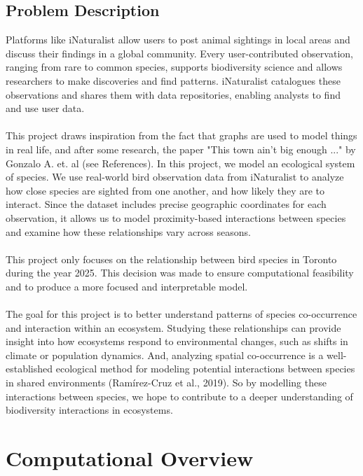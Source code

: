 \documentclass{article}
\begin{document}
\subsection*{Problem Description}
Platforms like iNaturalist allow users to post animal sightings in local areas and discuss their findings in a global community. Every user-contributed observation, ranging from rare to common species, supports biodiversity science and allows researchers to make discoveries and find patterns. iNaturalist catalogues these observations and shares them with data repositories, enabling analysts to find and use user data.\\ \\
This project draws inspiration from the fact that graphs are used to model things in real life, and after some research, the paper "This town ain't big enough ..." by Gonzalo A. et. al (see References). In this project, we model an ecological system of species. We use real-world bird observation data from iNaturalist to analyze how close species are sighted from one another, and how likely they are to interact. Since the dataset includes precise geographic coordinates for each observation, it allows us to model proximity-based interactions between species and examine how these relationships vary across seasons. \\ \\
This project only focuses on the relationship between bird species in Toronto during the year 2025. This decision was made to ensure computational feasibility and to produce a more focused and interpretable model. \\ \\
The goal for this project is to better understand patterns of species co-occurrence and interaction within an ecosystem. Studying these relationships can provide insight into how ecosystems respond to environmental changes, such as shifts in climate or population dynamics. And, analyzing spatial co-occurrence is a well-established ecological method for modeling potential interactions between species in shared environments (Ramírez-Cruz et al., 2019). So by modelling these interactions between species, we hope to contribute to a deeper understanding of biodiversity interactions in ecosystems. \\ 



\section{Computational Overview} 
\end{document}
